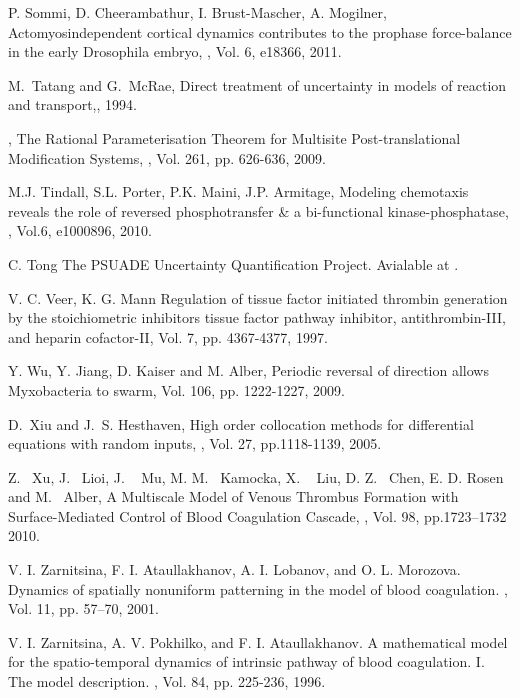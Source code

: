 \begin{thebibliography}{99}
\newblock P. Sommi, D. Cheerambathur, I. Brust-Mascher, A. Mogilner,
\newblock Actomyosindependent cortical dynamics contributes to the prophase
force-balance in the early Drosophila embryo, , Vol. 6,  e18366, 2011.

M.~Tatang and G.~McRae, \newblock Direct treatment of uncertainty in
models of reaction and transport,,
1994.

, \newblock The Rational Parameterisation
Theorem for Multisite Post-translational Modification Systems,
, Vol. 261, pp.
626-636, 2009.

\newblock M.J. Tindall, S.L. Porter, P.K. Maini, J.P. Armitage, \newblock Modeling
chemotaxis reveals the role of reversed phosphotransfer \& a
bi-functional kinase-phosphatase, , Vol.6, e1000896, 2010.

C. Tong
\newblock The PSUADE Uncertainty Quantification Project.
Avialable at
.

V. C. Veer, K. G. Mann \newblock Regulation of tissue factor
initiated thrombin generation by the stoichiometric inhibitors
tissue factor pathway inhibitor, antithrombin-III, and heparin
cofactor-II,
 Vol. 7, pp. 4367-4377, 1997.

\newblock Y. Wu, Y. Jiang, D. Kaiser and M. Alber, \newblock Periodic reversal of
direction allows Myxobacteria to swarm,  Vol. 106, pp. 1222-1227, 2009.

D.~Xiu and J.~S. Hesthaven, \newblock High order collocation methods
for differential equations with random inputs, , Vol. 27, pp.1118-1139, 2005.

Z. ~Xu, J. ~Lioi, J. ~ Mu,  M. M. ~Kamocka, X. ~ Liu, D. Z. ~Chen,
E. D. Rosen and M.~ Alber, A Multiscale Model of Venous Thrombus
Formation with Surface-Mediated Control of Blood Coagulation
Cascade, ,  Vol. 98,
pp.1723--1732 2010.


V. I. Zarnitsina, F. I. Ataullakhanov, A. I. Lobanov, and O. L.
Morozova.
\newblock Dynamics of spatially nonuniform patterning in the model of blood coagulation.
, Vol. 11, pp. 57--70, 2001.

V. I. Zarnitsina, A. V. Pokhilko, and F. I. Ataullakhanov.
\newblock A mathematical model for the spatio-temporal dynamics of intrinsic pathway of blood coagulation. I. The model description.
, Vol. 84, pp. 225-236, 1996.


\end{thebibliography}

